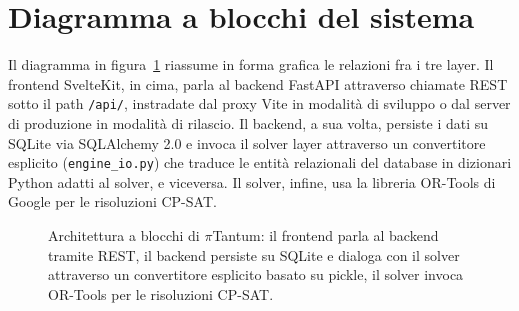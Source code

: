 \section{Diagramma a blocchi del sistema}

Il diagramma in figura~\ref{fig:arch_panoramica} riassume in
forma grafica le relazioni fra i tre layer. Il frontend
SvelteKit, in cima, parla al backend FastAPI attraverso
chiamate REST sotto il path \texttt{/api/}, instradate dal
proxy Vite in modalit\`a di sviluppo o dal server di
produzione in modalit\`a di rilascio. Il backend, a sua volta,
persiste i dati su SQLite via SQLAlchemy 2.0 e invoca il
solver layer attraverso un convertitore esplicito
(\texttt{engine\_io.py}) che traduce le entit\`a relazionali
del database in dizionari Python adatti al solver, e
viceversa. Il solver, infine, usa la libreria OR-Tools di
Google per le risoluzioni CP-SAT.

\begin{figure}[h]
\centering
{}
\caption{Architettura a blocchi di $\pi$Tantum: il frontend
parla al backend tramite REST, il backend persiste su SQLite
e dialoga con il solver attraverso un convertitore esplicito
basato su pickle, il solver invoca OR-Tools per le
risoluzioni CP-SAT.}
\label{fig:arch_panoramica}
\end{figure}


